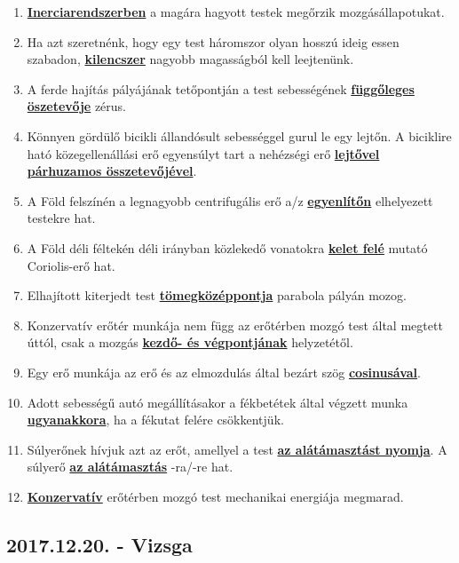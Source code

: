 \documentclass[../../fizika_kerdesek.tex]{subfiles}
\begin{document}
        \begin{enumerate}
            \item \underline{\textbf{Inerciarendszerben}} a magára hagyott testek megőrzik mozgásállapotukat. 
            \item Ha azt szeretnénk, hogy egy test háromszor olyan hosszú ideig essen szabadon, \underline{\textbf{kilencszer}} nagyobb magasságból kell leejtenünk.
            \item A ferde hajítás pályájának tetőpontján a test sebességének \underline{\textbf{függőleges öszetevője}} zérus.
            \item Könnyen gördülő bicikli állandósult sebességgel gurul le egy lejtőn. A biciklire ható közegellenállási erő egyensúlyt tart a nehézségi erő \underline{\textbf{lejtővel párhuzamos összetevőjével}}.
            \item A Föld felszínén a legnagyobb centrifugális erő a/z \underline{\textbf{egyenlítőn}} elhelyezett testekre hat.
            \item A Föld déli féltekén déli irányban közlekedő vonatokra \underline{\textbf{kelet felé}} mutató Coriolis-erő hat.
            \item Elhajított kiterjedt test \underline{\textbf{tömegközéppontja}} parabola pályán mozog.
            \item Konzervatív erőtér munkája nem függ az erőtérben mozgó test által megtett úttól, csak a mozgás \underline{\textbf{kezdő- és végpontjának}} helyzetétől.
            \item Egy erő munkája az erő és az elmozdulás által bezárt szög \underline{\textbf{cosinusával}}.
            \item Adott sebességű autó megállításakor a fékbetétek által végzett munka \underline{\textbf{ugyanakkora}}, ha a fékutat felére csökkentjük.
            \item Súlyerőnek hívjuk azt az erőt, amellyel a test \underline{\textbf{az alátámasztást nyomja}}. A súlyerő \underline{\textbf{az alátámasztás}} -ra/-re hat.
            \item \underline{\textbf{Konzervatív}} erőtérben mozgó test mechanikai energiája megmarad.
        \end{enumerate}

    \subsection{2017.12.20. - Vizsga}
\end{document}
